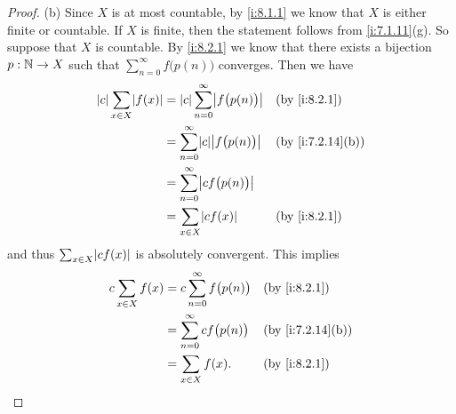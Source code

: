 \begin{proof}{(b)}
  Since \(X\) is at most countable, by \cref{i:8.1.1} we know that \(X\) is either finite or countable.
  If \(X\) is finite, then the statement follows from \cref{i:7.1.11}(g).
  So suppose that \(X\) is countable.
  By \cref{i:8.2.1} we know that there exists a bijection \(p : \mathbb{N} \to X\) such that \(\sum_{n = 0}^\infty f\big(p(n)\big)\) converges.
  Then we have
  \begin{align*}
    \abs{c} \sum_{x \in X} \abs{f(x)} & = \abs{c} \sum_{n = 0}^\infty \abs{f\big(p(n)\big)} &  & \by{i:8.2.1}     \\
                                      & = \sum_{n = 0}^\infty \abs{c} \abs{f\big(p(n)\big)} &  & \by{i:7.2.14}[b] \\
                                      & = \sum_{n = 0}^\infty \abs{c f\big(p(n)\big)}                             \\
                                      & = \sum_{x \in X} \abs{c f(x)}                       &  & \by{i:8.2.1}
  \end{align*}
  and thus \(\sum_{x \in X} \abs{c f(x)}\) is absolutely convergent.
  This implies
  \begin{align*}
    c \sum_{x \in X} f(x) & = c \sum_{n = 0}^\infty f\big(p(n)\big) &  & \by{i:8.2.1}     \\
                          & = \sum_{n = 0}^\infty c f\big(p(n)\big) &  & \by{i:7.2.14}[b] \\
                          & = \sum_{x \in X} f(x).                  &  & \by{i:8.2.1}
  \end{align*}
\end{proof}

